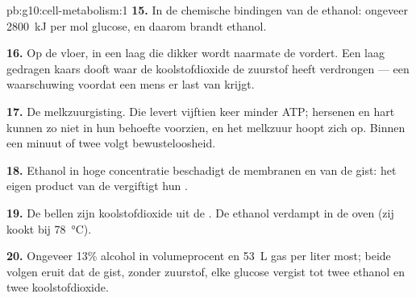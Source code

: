 \begin{solution}{pb:g10:cell-metabolism:1}
\textbf{15.} In de chemische bindingen van de ethanol: ongeveer
\qty{2800}{kJ} per mol glucose, en daarom brandt ethanol.

\textbf{16.} Op de vloer, in een laag die dikker wordt naarmate de
 vordert. Een laag gedragen kaars dooft waar de koolstofdioxide
de zuurstof heeft verdrongen --- een waarschuwing voordat een mens er
last van krijgt.

\textbf{17.} De melkzuurgisting. Die levert vijftien keer minder ATP;
hersenen en hart kunnen zo niet in hun behoefte voorzien, en het
melkzuur hoopt zich op. Binnen een minuut of twee volgt bewusteloosheid.

\textbf{18.} Ethanol in hoge concentratie beschadigt de membranen en
 van de gist: het eigen product van de  vergiftigt hun
.

\textbf{19.} De bellen zijn koolstofdioxide uit de . De ethanol
verdampt in de oven (zij kookt bij \qty{78}{\celsius}).

\textbf{20.} Ongeveer 13\% alcohol in volumeprocent en \qty{53}{L} gas
per liter most; beide volgen eruit dat de gist, zonder zuurstof, elke
glucose vergist tot twee ethanol en twee koolstofdioxide.
\end{solution}

